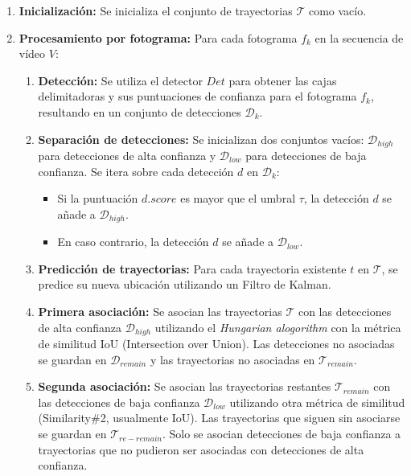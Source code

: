 \documentclass[11pt,spanish,listoffigures,listoftables]{tfgetsinf}
\begin{document}
\begin{enumerate}
   \item \textbf{Inicialización:} Se inicializa el conjunto de trayectorias $\mathcal{T}$ como vacío.
   \item \textbf{Procesamiento por fotograma:} Para cada fotograma $f_k$ en la secuencia de vídeo $V$:
   { %
   \renewcommand{\theenumii}{\theenumi.\arabic{enumii}} %
   \renewcommand{\labelenumii}{\theenumii.} %
   \begin{enumerate}
      \item \textbf{Detección:} Se utiliza el detector $Det$ para obtener las cajas delimitadoras y sus puntuaciones de confianza para el fotograma $f_k$, resultando en un conjunto de detecciones $\mathcal{D}_k$.
      \item \textbf{Separación de detecciones:} Se inicializan dos conjuntos vacíos: $\mathcal{D}_{high}$ para detecciones de alta confianza y $\mathcal{D}_{low}$ para detecciones de baja confianza. Se itera sobre cada detección $d$ en $\mathcal{D}_k$:
      \begin{itemize}
         \item Si la puntuación $d.score$ es mayor que el umbral $\tau$, la detección $d$ se añade a $\mathcal{D}_{high}$.
         \item En caso contrario, la detección $d$ se añade a $\mathcal{D}_{low}$.
      \end{itemize}
      \item \textbf{Predicción de trayectorias:} Para cada trayectoria existente $t$ en $\mathcal{T}$, se predice su nueva ubicación utilizando un Filtro de Kalman.
      \item \textbf{Primera asociación:} Se asocian las trayectorias $\mathcal{T}$ con las detecciones de alta confianza $\mathcal{D}_{high}$ utilizando el \textit{Hungarian alogorithm}\cite{kuhn1955hungarian} con la métrica de similitud IoU (Intersection over Union). Las detecciones no asociadas se guardan en $\mathcal{D}_{remain}$ y las trayectorias no asociadas en $\mathcal{T}_{remain}$.
      \item \textbf{Segunda asociación:} Se asocian las trayectorias restantes $\mathcal{T}_{remain}$ con las detecciones de baja confianza $\mathcal{D}_{low}$ utilizando otra métrica de similitud (Similarity\#2, usualmente IoU). Las trayectorias que siguen sin asociarse se guardan en $\mathcal{T}_{re-remain}$. Solo se asocian detecciones de baja confianza a trayectorias que no pudieron ser asociadas con detecciones de alta confianza.

\end{enumerate}}
\end{enumerate}
\end{document}
